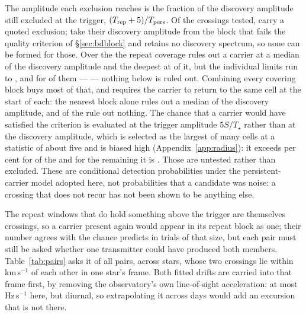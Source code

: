 The amplitude each exclusion reaches is the fraction of the discovery
amplitude still excluded at the trigger, $(T_{\rm rep}+5)/T_{\rm pers}$. Of
the \RcNTested{} crossings tested, \RcNExcl{} carry a quoted exclusion;
\RcNWithheld{} take their discovery amplitude from the block that fails the
quality criterion of \S\ref{sec:bdblock} and \RcNNoSpec{} retains no discovery
spectrum, so none can be formed for those. Over the \RcNExcl{} the repeat
coverage rules out a carrier at a median \RcFracMed{} of the discovery
amplitude and the deepest at \RcFracMin{} of it, but the individual limits run
to \RcFracMax, and for \RcNFracWeak{} of them --- \RcFracWeakList{} --- nothing
below \RcFracWeakLo{} is ruled out. Combining every covering block buys most
of that, and requires the carrier to return to the same cell at the start of
each: the nearest block alone rules out a median \TjFracNearMed{} of the
discovery amplitude, and \TjNNearWeak{} of the \TjCombNCross{} rule out
nothing. The chance that a carrier would have satisfied the criterion is
evaluated at the trigger amplitude $5S/T_\star$ rather than at the
discovery amplitude, which is selected as the largest of many cells at a
statistic of about five and is biased high (Appendix~\ref{app:radius}): it
exceeds \RcPowerLevel{} per cent for \RqNPowerHi{} of the \RcNExcl{} and for
the remaining \RcNPowerLoTrig{} it is \RqLowList. Those \RcNPowerLoTrig{} are
untested rather than excluded. These are conditional detection probabilities
under the persistent-carrier model adopted here, not probabilities that a
candidate was noise: a crossing that does not recur has not been shown to be
anything else.

The \WdNExc{} repeat windows that do hold something above the trigger are
themselves crossings, so a carrier present again would appear in its repeat
block as one; their number agrees with the \WdExpect{} chance predicts in
trials of that size, but each pair must still be asked whether one transmitter
could have produced both members. Table~\ref{tab:pairs} asks it of all
\TjNPair{} pairs, across
\TjNStarPair{} stars, whose two crossings lie within
\WdHalfKms\,km\,s$^{-1}$ of each other in one star's frame. Both fitted drifts are
carried into that frame first, by removing the observatory's own
line-of-sight acceleration: at most \TjFrameMaxHzS\,Hz\,s$^{-1}$ here, but
diurnal, so extrapolating it across days would add an excursion that is not
there.

